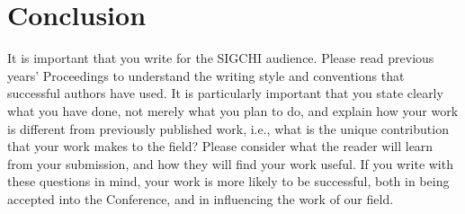 \section{Conclusion}

It is important that you write for the SIGCHI audience.  Please read
                                previous years' Proceedings to understand the writing style and
                                conventions that successful authors have used.  It is particularly
                                important that you state clearly what you have done, not merely what
                                you plan to do, and explain how your work is different from previously
                                published work, i.e., what is the unique contribution that your work
                                makes to the field?  Please consider what the reader will learn from
                                your submission, and how they will find your work useful.  If you
                                write with these questions in mind, your work is more likely to be
                                successful, both in being accepted into the Conference, and in
                                influencing the work of our field.